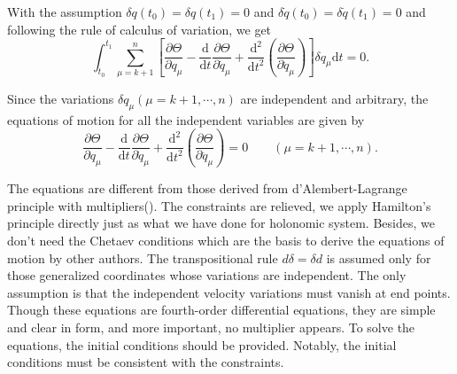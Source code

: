 \documentclass[preprint,11pt]{elsarticle}
\newcommand{\mathd}{\mathrm{d}}
\begin{document}
With the assumption $\delta q ( t_0) = \delta q ( t_1) = 0$ and $\delta
\dot{q} ( t_0) = \delta \dot{q} ( t_1) = 0$ and following the rule of calculus of variation, we get
\begin{equation}
 \int_{t_0}^{t_1}  \sum_{\mu = k + 1}^n \left[ \frac{\partial
   \Theta}{\partial q_{\mu}} - \frac{\mathd}{\mathd t} \frac{\partial
   \Theta}{\partial \dot{q}_{\mu}} + \frac{\mathd^2}{\mathd t^2} \left(
   \frac{\partial \Theta}{\partial \ddot{q}_{\mu}} \right) \right] \delta
   q_{\mu} \mathd t = 0.
\end{equation}



Since the variations $\delta q_{\mu}  ( \mu = k + 1, \cdots, n)$ are independent and arbitrary, the
equations of motion for all the independent variables are given by
\begin{equation}\label{modeleqn}
  \frac{\partial \Theta}{\partial q_{\mu}} - \frac{\mathd}{\mathd t}
  \frac{\partial \Theta}{\partial \dot{q}_{\mu}} +
  \frac{\mathd^2}{\mathd t^2} \left( \frac{\partial \Theta}{\partial
  \ddot{q}_{\mu}} \right) = 0 \hspace{2em} ( \mu = k + 1, \cdots, n) .
\end{equation}

The equations are different from those derived from d'Alembert-Lagrange principle with multipliers(\cite{goldenstein,Neimark}).
The constraints are relieved, we apply Hamilton's principle directly just as what we have done for holonomic system.
Besides, we don't need  the Chetaev conditions which are the basis to derive the equations of motion by other authors.
The transpositional rule $d \delta=\delta d$ is assumed only for those generalized coordinates whose variations are independent.
The only assumption is that the independent velocity variations must vanish at end points.
Though these equations are fourth-order differential equations, they are simple and clear in form, and more important, no multiplier appears.
To solve the equations, the initial conditions should be provided. Notably, the initial conditions must be consistent with the constraints.
\end{document}
